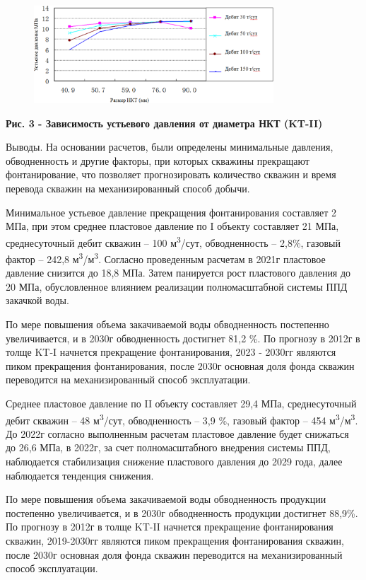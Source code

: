 \begin{figure}[H]
	\centering
	\includegraphics[width=0.8\textwidth]{assets/303}
	\caption*{}
\end{figure}

{\bfseries Рис. 3 - Зависимость устьевого давления от диаметра НКТ (KT-II)}

Выводы. На основании расчетов, были определены минимальные давления,
обводненность и другие факторы, при которых скважины прекращают
фонтанирование, что позволяет прогнозировать количество скважин и время
перевода скважин на механизированный способ добычи.

Минимальное устьевое давление прекращения фонтанирования составляет 2
МПа, при этом среднее пластовое давление по I объекту составляет 21 МПа,
среднесуточный дебит скважин -- 100 м\textsuperscript{3}/сут,
обводненность -- 2,8\%, газовый фактор -- 242,8
м\textsuperscript{3}/м\textsuperscript{3}. Согласно проведенным расчетам
в 2021г пластовое давление снизится до 18,8 МПа. Затем панируется рост
пластового давления до 20 МПа, обусловленное влиянием реализации
полномасштабной системы ППД закачкой воды.

По мере повышения объема закачиваемой воды обводненность постепенно
увеличивается, и в 2030г обводненность достигнет 81,2 \%. По прогнозу в
2012г в толще KT-I начнется прекращение фонтанирования, 2023 - 2030гг
являются пиком прекращения фонтанирования, после 2030г основная доля
фонда скважин переводится на механизированный способ эксплуатации.

Среднее пластовое давление по II объекту составляет 29,4 МПа,
среднесуточный дебит скважин -- 48 м\textsuperscript{3}/сут,
обводненность -- 3,9 \%, газовый фактор -- 454
м\textsuperscript{3}/м\textsuperscript{3}. До 2022г согласно выполненным
расчетам пластовое давление будет снижаться до 26,6 МПа, в 2022г, за
счет полномасштабного внедрения системы ППД, наблюдается стабилизация
снижение пластового давления до 2029 года, далее наблюдается тенденция
снижения.

По мере повышения объема закачиваемой воды обводненность продукции
постепенно увеличивается, и в 2030г обводненность продукции достигнет
88,9\%. По прогнозу в 2012г в толще KT-II начнется прекращение
фонтанирования скважин, 2019-2030гг являются пиком прекращения
фонтанирования скважин, после 2030г основная доля фонда скважин
переводится на механизированный способ эксплуатации.

